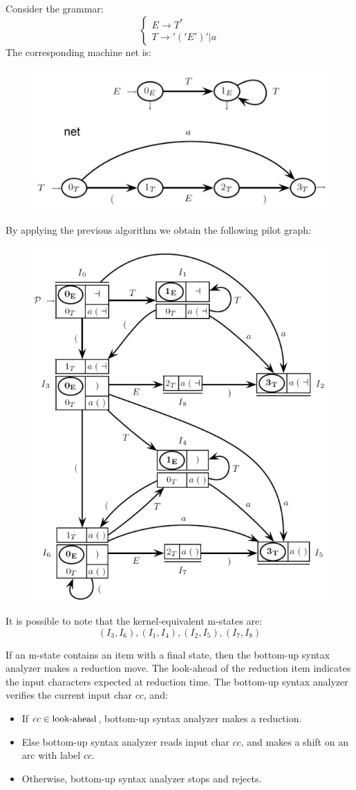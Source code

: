 \begin{example}
    Consider the grammar: 
    \[
    \begin{cases}
        E \rightarrow T^{*} \\
        T \rightarrow '('E')'|a
    \end{cases}
    \]
    The corresponding machine net is: 
    \begin{figure}[H]
        \centering
        \includegraphics[width=0.5\linewidth]{images/net2.png}
    \end{figure}
    By applying the previous algorithm we obtain the following pilot graph: 
    \begin{figure}[H]
        \centering
        \includegraphics[width=0.5\linewidth]{images/pil.png}
    \end{figure}
    It is possible to note that the kernel-equivalent m-states are: 
    \[(I_3, I_6),(I_1, I_4),(I_2, I_5),(I_7, I_8)\]
\end{example}
If an m-state contains an item with a final state, then the bottom-up syntax analyzer makes a reduction move. 
The look-ahead of the reduction item indicates the input characters expected at reduction time. 
The bottom-up syntax analyzer verifies the current input char $cc$, and: 
\begin{itemize}
    \item If $cc \in \textnormal{look-ahead}$, bottom-up syntax analyzer makes a reduction.
    \item Else bottom-up syntax analyzer reads input char $cc$, and makes a shift on an arc with label $cc$.
    \item Otherwise, bottom-up syntax analyzer stops and rejects.
\end{itemize}

